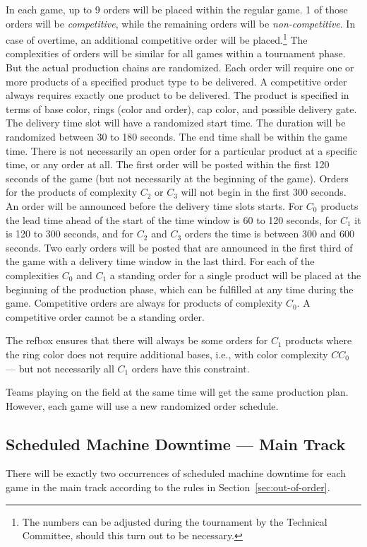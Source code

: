 \documentclass[12pt,twoside]{article}
\newcommand{\refsec}[1]{Section~\ref{#1}}
\begin{document}
In each game, up to 9 orders will be placed within the regular game.
1 of those orders will be \emph{competitive}, while the remaining
orders will be \emph{non-competitive}. In case of overtime, an
additional competitive order will be placed.\footnote{The numbers can
be adjusted during the tournament by the Technical Committee, should
this turn out to be necessary.}
The complexities of orders will be similar for all games within a
tournament phase. But the actual production chains are randomized.
Each order will require one or more products of a specified product
type to be delivered. A competitive order always requires exactly one
product to be delivered. The product is specified in terms of base
color, rings (color and order), cap color, and possible delivery gate.
The delivery time slot will have a randomized start time. The duration
will be randomized between 30 to 180 seconds. The end time shall be
within the game time. There is not necessarily an open order for a
particular product at a specific time, or any order at all. The first
order will be posted within the first 120 seconds of the game (but not
necessarily at the beginning of the game). Orders for the products of
complexity $C_2$ or $C_3$ will not begin in the first 300 seconds. An
order will be announced before the delivery time slots starts. For
$C_0$ products the lead time ahead of the start of the time window is
60 to 120 seconds, for $C_1$ it is 120 to 300 seconds, and for $C_2$
and $C_3$ orders the time is between 300 and 600 seconds. Two early
orders will be posted that are announced in the first third of the
game with a delivery time window in the last third. For each of the
complexities $C_0$ and $C_1$ a standing order for a single product
will be placed at the beginning of the production phase, which can be
fulfilled at any time during the game. Competitive orders are always for
products of complexity $C_0$. A competitive order cannot be a standing order.

The \ac{refbox} ensures that there will always
be some orders for $C_1$ products where the ring color does not
require additional bases, i.e., with color complexity $CC_0$ --- but
not necessarily all $C_1$ orders have this constraint.

Teams playing on the field at the same time will get the same
production plan. However, each game will use a new randomized order
schedule.

\subsection{Scheduled Machine Downtime --- Main Track}
There will be exactly two occurrences of scheduled machine downtime for each
game in the main track according to the rules in \refsec{sec:out-of-order}.
\end{document}
